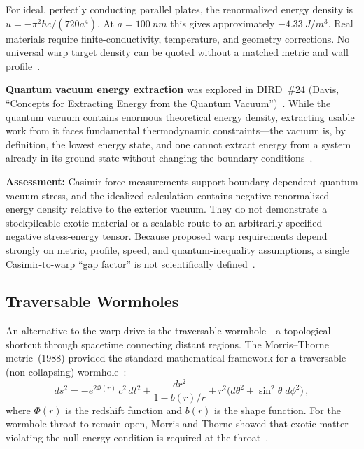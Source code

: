 \documentclass[aps,prd,twocolumn,superscriptaddress,nofootinbib,floatfix]{revtex4-2}
\begin{document}
For ideal, perfectly conducting parallel plates, the renormalized energy density
is $u=-\pi^{2}\hbar c/(720a^{4})$. At $a=\SI{100}{nm}$ this gives approximately
$-\SI{4.33}{J/m^{3}}$. Real materials require
finite-conductivity, temperature, and geometry corrections. No universal warp
target density can be quoted without a matched metric and wall
profile~\cite{Alcubierre1994,PfenningFord1997,Casimir1948,Lamoreaux1997}.

\textbf{Quantum vacuum energy extraction} was explored in DIRD~\#24 (Davis,
``Concepts for Extracting Energy from the Quantum
Vacuum'')~\cite{DIRD_Davis_Vacuum}. While the quantum vacuum contains enormous
theoretical energy density, extracting usable work from it faces fundamental
thermodynamic constraints---the vacuum is, by definition, the lowest energy state,
and one cannot extract energy from a system already in its ground state without
changing the boundary conditions~\cite{DIRD_Davis_Vacuum,DIRD_Davis_Tomography}.

\textbf{Assessment:} Casimir-force measurements support boundary-dependent quantum
vacuum stress, and the idealized calculation contains negative renormalized energy
density relative to the exterior vacuum. They do not demonstrate a stockpileable
exotic material or a scalable route to an arbitrarily specified negative
stress-energy tensor. Because proposed warp requirements depend strongly on
metric, profile, speed, and quantum-inequality assumptions, a single
Casimir-to-warp ``gap factor'' is not scientifically
defined~\cite{PfenningFord1997,Casimir1948,Lamoreaux1997,DIRD_Davis_Vacuum,DIRD_Davis_Tomography}.

\subsection{Traversable Wormholes}\label{sec:wormholes}

An alternative to the warp drive is the traversable wormhole---a topological
shortcut through spacetime connecting distant regions. The Morris--Thorne
metric~(1988) provided the standard mathematical framework for a traversable
(non-collapsing) wormhole~\cite{MorrisThorne1988}:
\begin{equation}\label{eq:morris-thorne}
  ds^{2} = -e^{2\Phi(r)}\,c^{2}\,dt^{2}
  + \frac{dr^{2}}{1 - b(r)/r}
  + r^{2}\bigl(d\theta^{2} + \sin^{2}\!\theta\;d\phi^{2}\bigr)\,,
\end{equation}
where $\Phi(r)$ is the redshift function and $b(r)$ is the shape function. For
the wormhole throat to remain open, Morris and Thorne showed that exotic matter
violating the null energy condition is required at the
throat~\cite{MorrisThorne1988,Visser1995}.
\end{document}
